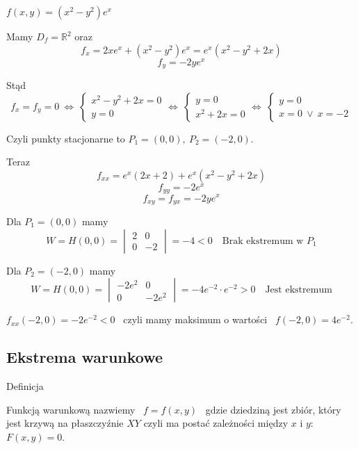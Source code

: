 \begin{przyklad}
    $ f(x,y) = (x^2 - y^2)e^x $
    
    Mamy $ D_f = \mathbb{R}^2 $ oraz
    $$ f_x = 2xe^x + (x^2 - y^2)e^x = e^x(x^2 - y^2 + 2x) $$
    $$ f_y = -2ye^x $$

    Stąd
    $$ f_x = f_y = 0 \ \Leftrightarrow \ \begin{cases} x^2 - y^2 + 2x = 0 \\ y = 0 \end{cases} \Leftrightarrow \
    \begin{cases} y = 0 \\ x^2 + 2x = 0 \end{cases} \Leftrightarrow \ \begin{cases} y = 0 \\ x = 0 \ \lor \ x=-2 \end{cases} $$

    Czyli punkty stacjonarne to $ P_1 = (0,0), \ P_2 = (-2, 0) $.

    Teraz
    $$ f_{xx} = e^x(2x + 2) + e^x(x^2 - y^2 + 2x) $$
    $$ f_{yy} = -2e^x $$
    $$ f_{xy} = f_{yx} = -2ye^x $$

    Dla $ P_1 = (0,0) $ mamy
    $$ W = H(0,0) = \begin{vmatrix} 2 & 0 \\ 0 & -2 \end{vmatrix} = -4 < 0 \quad \textrm{Brak ekstremum w } P_1 $$

    Dla $ P_2 = (-2, 0) $ mamy
    $$ W = H(0,0) = \begin{vmatrix} -2e^2 & 0 \\ 0 & -2e^2 \end{vmatrix} = -4e^{-2} \cdot e^{-2} > 0 \quad \textrm{Jest ekstremum} $$

    $ f_{xx}(-2, 0) = -2e^{-2} < 0 $ \ czyli mamy maksimum o wartości \ $ f(-2, 0) = 4e^{-2} $.
\end{przyklad}

\subsection{Ekstrema warunkowe}

\begin{tw}{Definicja}

Funkcją warunkową nazwiemy \ $ f = f(x,y) $ \ gdzie dziedziną jest zbiór, który jest krzywą na płaszczyźnie $XY$ czyli ma postać zależności
między $x$ i $y$: \ $F(x,y) = 0$.
\end{tw}

